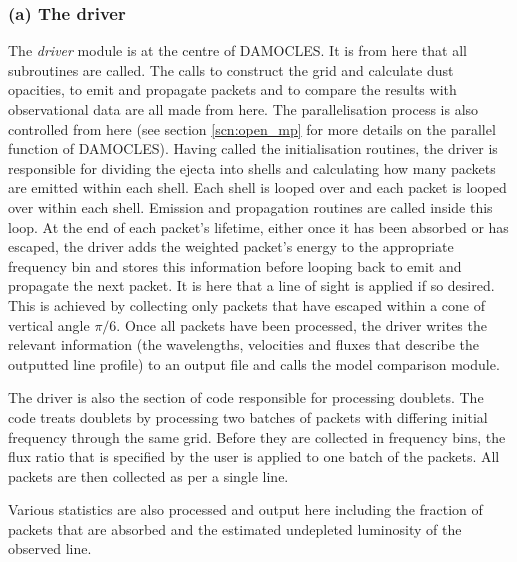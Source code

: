         \subsubsection{(a) The driver}
        The \textit{driver} module is at the centre of DAMOCLES.  It is from here that all subroutines are called.  The calls to construct the grid and calculate dust opacities, to emit and propagate packets and to compare the results with observational data are all made from here.  The parallelisation process is also controlled from here (see section \ref{scn:open_mp} for more details on the parallel function of DAMOCLES).  Having called the initialisation routines, the driver is responsible for dividing the ejecta into shells and calculating how many packets are emitted within each shell.  Each shell is looped over and each packet is looped over within each shell. Emission and propagation routines are called inside this loop.  At the end of each packet's lifetime, either once it has been absorbed or has escaped, the driver adds the weighted packet's energy to the appropriate frequency bin and stores this information before looping back to emit and propagate the next packet.  It is here that a line of sight is applied if so desired.  This is achieved by collecting only packets that have escaped within a cone of vertical angle $\pi/6$.  Once all packets have been processed, the driver writes the relevant information (the wavelengths, velocities and fluxes that describe the outputted line profile) to an output file and calls the model comparison module.  
        
        The driver is also the section of code responsible for processing doublets.  The code treats doublets by processing two batches of packets with differing initial frequency through the same grid.  Before they are collected in frequency bins, the flux ratio that is specified by the user is applied to one batch of the packets.  All packets are then collected as per a single line. 
        
        Various statistics are also processed and output here including the fraction of packets that are absorbed and the estimated undepleted luminosity of the observed line. 
        

